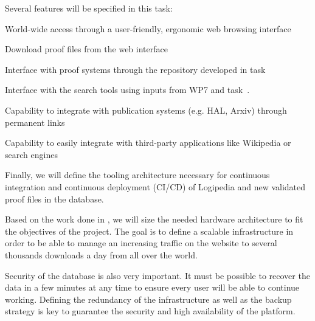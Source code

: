 \begin{workpackage}[id=access,type=RTD,wphases=1-48,
  short=Access,%
  title={Access},
  lead=Inr,InrRM=48,OcaRM=6,EduRM=12]
\begin{tasklist}
{\begin{task}[id=archi,
      title=Defining the functional and software architecture,
      shorttitle=Defining the functional and software architecture,
      lead=Inr,InrRM=3,wphases=2-5]
    Several features will be specified in this task:
    \begin{compactitem}
    \item World-wide access through a user-friendly, ergonomic web
      browsing interface
    \item Download proof files from the web interface
    \item Interface with proof systems through the repository developed
      in task~
    \item Interface with the search tools using inputs from WP7 and
      task~.
    \item Capability to integrate with publication systems (e.g. HAL,
      Arxiv) through permanent links
    \item Capability to easily integrate with third-party applications
      like Wikipedia or search engines
    \end{compactitem}

    Finally, we will define the tooling architecture necessary for
    continuous integration and continuous deployment (CI/CD) of
    Logipedia and new validated proof files in the database.
  \end{task}

  \begin{task}[id=infra,
      title=Defining the hardware architecture for the infrastructure,
      shorttitle=Defining the hardware architecture for the infrastructure,
      lead=Inr,InrRM=1,wphases=6-7]
    Based on the work done in , we will
    size the needed hardware architecture to fit the objectives of the
    project. The goal is to define a scalable infrastructure in order
    to be able to manage an increasing traffic on the website to
    several thousands downloads a day from all over the world.

    Security of the database is also very important. It must be
    possible to recover the data in a few minutes at any time to
    ensure every user will be able to continue working. Defining the
    redundancy of the infrastructure as well as the backup strategy is
    key to guarantee the security and high availability of the
    platform.


\end{task}}
\end{tasklist}
\end{workpackage}
